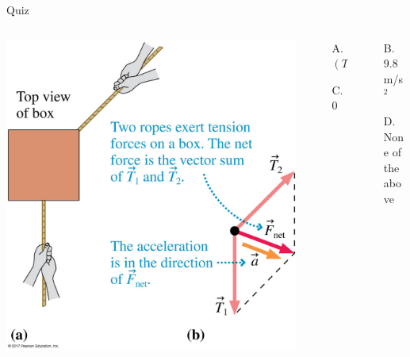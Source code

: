 \documentclass{beamer}
\begin{document}
\begin{frame}{Quiz}
\begin{enumerate}
\begin{columns}
\begin{column}{0.35\textwidth}
\begin{center}
      \includegraphics[width=\textwidth]{../figures/05_17_Figure.jpg}
   \end{center}
   \end{column}
   \begin{column}{0.65\textwidth}
   \begin{columns}
   \begin{column}{0.5\textwidth}
   \begin{enumerate}
      \item[A.] $(T_1+T_2)/m$
      \item[C.] 0
   \end{enumerate}
   \end{column}
   \begin{column}{0.55\textwidth}
   \begin{enumerate}
      \item[B.] 9.8 m/s$^2$
      \item[D.] None of the above
   \end{enumerate}
   \end{column}
   \end{columns}
   \end{column}
   \end{columns}
\end{enumerate}
\end{frame}
\end{document}

